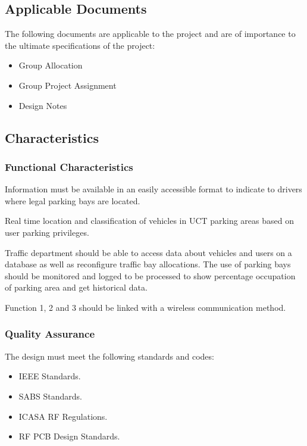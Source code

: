\subsection{Applicable Documents}
The following documents are applicable to the project and are of importance to the ultimate specifications of the project:
\begin{itemize}
\item Group Allocation
\item Group Project Assignment
\item Design Notes
\end{itemize}

\subsection{Characteristics}
\subsubsection{Functional Characteristics}
Information must be available in an easily accessible format to indicate to drivers where legal parking bays are located.

Real time location and classification of vehicles in UCT parking areas based on user parking privileges. 

Traffic department should be able to access data about vehicles and users on a database as well as reconfigure traffic bay allocations. The use of parking bays should be monitored and logged to be processed to show percentage occupation of parking area and get historical data.

Function 1, 2 and 3 should be linked with a wireless communication method.

\newpage
\subsubsection{Quality Assurance}
The design must meet the following standards and codes:
\begin{itemize}
\item IEEE Standards.
\item SABS Standards.
\item ICASA RF Regulations.
\item RF PCB Design Standards.
\end{itemize}

